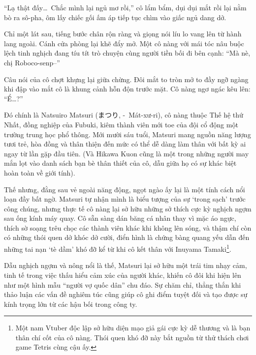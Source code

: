 \documentclass[../main.tex]{subfiles}
\begin{document}
``Lạ thật đấy\dots\ Chắc mình lại ngủ mơ rồi,'' cô lẩm bẩm, dụi dụi mắt rồi lại nằm bò ra sô-pha, ôm lấy chiếc gối ấm áp tiếp tục chìm vào giấc ngủ dang dở.

\ct

Chỉ một lát sau, tiếng bước chân rộn ràng và giọng nói líu lo vang lên từ hành lang ngoài. Cánh cửa phòng lại khẽ đẩy mở. Một cô nàng với mái tóc nâu buộc lệch tinh nghịch đang tíu tít trò chuyện cùng người tiền bối đi bên cạnh: ``Mà nè, chị Roboco-senp--''

Câu nói của cô chợt khựng lại giữa chừng. Đôi mắt to tròn mở to đầy ngỡ ngàng khi đập vào mắt cô là khung cảnh hỗn độn trước mặt. Cô nàng ngơ ngác kêu lên: ``Ể\dots?''

\chrint

Đó chính là Natsuiro Matsuri (まつり, -\ Mát-xư-ri), cô nàng thuộc Thế hệ thứ Nhất, đồng nghiệp của Fubuki, kiêm thành viên mới toe của đội cổ động một trường trung học phổ thông. Mới mười sáu tuổi, Matsuri mang nguồn năng lượng tươi trẻ, hòa đồng và thân thiện đến mức có thể dễ dàng làm thân với bất kỳ ai ngay từ lần gặp đầu tiên. (Và Hikawa Kuon cũng là một trong những người may mắn lọt vào danh sách bạn bè thân thiết của cô, dẫu giữa họ có sự khác biệt hoàn toàn về giới tính).


Thế nhưng, đằng sau vẻ ngoài năng động, ngọt ngào ấy lại là một tính cách nổi loạn đầy bất ngờ. Matsuri tự nhận mình là biểu tượng của sự `trong sạch' trước công chúng, nhưng thực tế cô nàng lại sở hữu những sở thích cực kỳ nghịch ngợm sau ống kính máy quay. Cô sẵn sàng dán băng cá nhân thay vì mặc áo ngực, thích sờ soạng trêu chọc các thành viên khác khi không lên sóng, và thậm chí còn có những thói quen dở khóc dở cười, điển hình là chứng bàng quang yếu dẫn đến những tai nạn `tè dầm' khó đỡ kể từ khi cô kết thân với Inuyama Tamaki\footnote{Một nam Vtuber độc lập sở hữu diện mạo giả gái cực kỳ dễ thương và là bạn thân chí cốt của cô nàng. Thói quen khó đỡ này bắt nguồn từ thử thách chơi game Tetris cùng cậu ấy.}.

Dẫu nghịch ngợm và nông nổi là thế, Matsuri lại sở hữu một trái tim nhạy cảm, tinh tế trong việc thấu hiểu cảm xúc của người khác, khiến cô đôi khi hiện lên như một hình mẫu ``người vợ quốc dân'' chu đáo. Sự chăm chỉ, thẳng thắn khi thảo luận các vấn đề nghiêm túc cũng giúp cô ghi điểm tuyệt đối và tạo được sự kính trọng lớn từ các hậu bối trong công ty.
\end{document}
